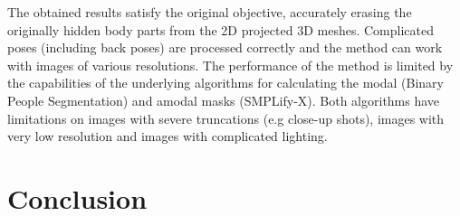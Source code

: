 \documentclass[]{interact}
\theoremstyle{plain}%
\theoremstyle{definition}
\theoremstyle{remark}
\begin{document}
{\color{blue}The obtained results satisfy the original objective, accurately erasing the originally hidden body parts from the 2D projected 3D meshes. Complicated poses (including back poses) are processed correctly and the method can work with images of various resolutions. The performance of the method is limited by the capabilities of the underlying algorithms for calculating the modal (Binary People Segmentation) and amodal masks (SMPLify-X). Both algorithms have limitations on images with severe truncations (e.g close-up shots), images with very low resolution and images with complicated lighting.} 
 

\section{Conclusion}
\end{document}
